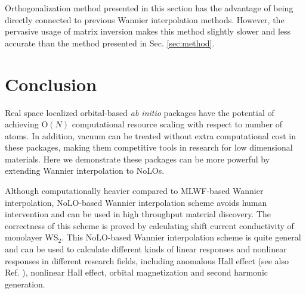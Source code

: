 Orthogonalization method presented in this section has the advantage of being directly connected to previous Wannier interpolation methods. However, the pervasive usage of matrix inversion makes this method slightly slower and less accurate than the method presented in Sec. \ref{sec:method}. 

\section{Conclusion}

Real space localized orbital-based \emph{ab initio} packages have the potential of achieving $\text{O}(N)$ computational resource scaling with respect to number of atoms. In addition, vacuum can be treated without extra computational cost in these packages, making them competitive tools in research for low dimensional materials. Here we demonstrate these packages can be more powerful by extending Wannier interpolation to NoLOs. 

Although computationally heavier compared to MLWF-based Wannier interpolation, NoLO-based Wannier interpolation scheme avoids human intervention and can be used in high throughput material discovery. The correctness of this scheme is proved by calculating shift current conductivity of monolayer WS$_2$. This NoLO-based Wannier interpolation scheme is quite general and can be used to calculate different kinds of linear responses and nonlinear responses in different research fields\cite{tokura_nonreciprocal_2018}, including anomalous Hall effect (see also Ref. ), nonlinear Hall effect, orbital magnetization and second harmonic generation.

